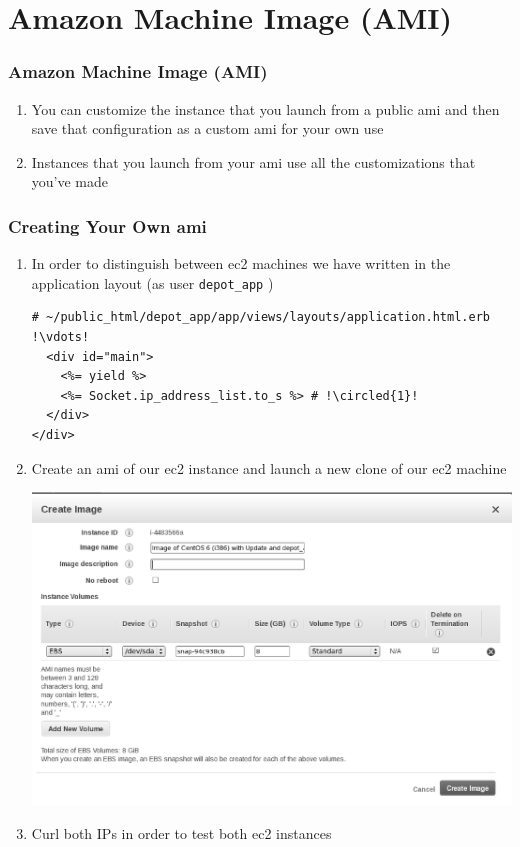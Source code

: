 \documentclass{beamer}
\newcommand*\circled[1]{\tikz[baseline=(char.base)]{
            \node[shape=circle,draw,inner sep=2pt] (char) {#1};}}
\begin{document}
\section{Amazon Machine Image (AMI)}
\begin{frame}
\frametitle{Amazon Machine Image (AMI)}
\begin{enumerate}
\item You can customize the instance that you launch from a public \acrshort{ami} and then save that configuration as a custom \acrshort{ami} for your own use
\item Instances that you launch from your \acrshort{ami} use all the customizations that you've made
\end{enumerate}

\end{frame}
\begin{frame}
\frametitle{Creating Your Own \acrshort{ami}}
\begin{enumerate}
\item In order to distinguish between \acrshort{ec2} machines we have written in the application layout (as user \texttt{depot\_app} )

\lstset{language=html, style=eclipse}
\begin{lstlisting}[escapechar=!]
# ~/public_html/depot_app/app/views/layouts/application.html.erb
!\vdots!
  <div id="main">
    <%= yield %>
    <%= Socket.ip_address_list.to_s %> # !\circled{1}!
  </div>
</div>
\end{lstlisting}

\item Create an \acrshort{ami} of our \acrshort{ec2} instance and launch a new clone of our \acrshort{ec2} machine
\begin{center}
\includegraphics[scale=0.25]{createimage.eps}
\end{center}
\item Curl both IPs in order to test both \acrshort{ec2} instances
\end{enumerate}

\end{frame}
\end{document}
